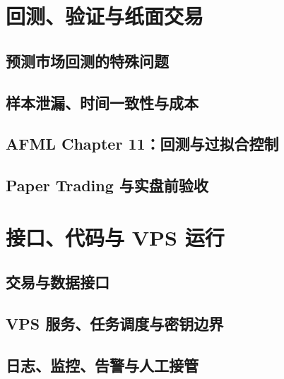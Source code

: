 
\section{回测、验证与纸面交易}

\subsection{预测市场回测的特殊问题}

\subsection{样本泄漏、时间一致性与成本}

\subsection{AFML Chapter 11：回测与过拟合控制}

\subsection{Paper Trading 与实盘前验收}


\section{接口、代码与 VPS 运行}

\subsection{交易与数据接口}

\subsection{VPS 服务、任务调度与密钥边界}

\subsection{日志、监控、告警与人工接管}

